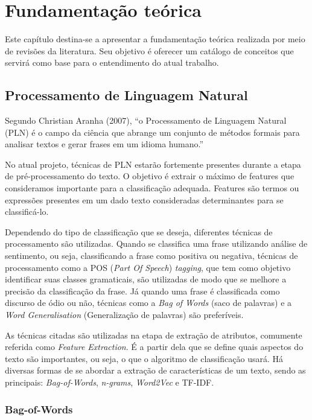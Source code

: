 \chapter[Fundamentação teórica]{Fundamentação teórica}

Este capítulo destina-se a apresentar a fundamentação teórica realizada por meio de revisões da literatura. Seu objetivo é oferecer um catálogo de conceitos que servirá como base para o entendimento do atual trabalho.

\section[Processamento de Linguagem	 Natural]{Processamento de Linguagem Natural}

Segundo Christian Aranha (2007), “o Processamento de Linguagem Natural (PLN) é o campo da ciência que abrange um conjunto de métodos formais para analisar textos e gerar frases em um idioma humano.”

No atual projeto, técnicas de PLN estarão fortemente presentes durante a etapa de pré-processamento do texto. O objetivo é extrair o máximo de features que consideramos importante para a classificação adequada. Features são termos ou expressões presentes em um dado texto consideradas determinantes para se classificá-lo.

Dependendo do tipo de classificação que se deseja, diferentes técnicas de processamento são utilizadas. Quando se classifica uma frase utilizando análise de sentimento, ou seja, classificando a frase como positiva ou negativa, técnicas de processamento como a POS (\textit{Part Of Speech}) \textit{tagging}, que tem como objetivo identificar suas classes gramaticais, são utilizadas de modo que se melhore a precisão da classificação da frase. Já quando uma frase é classificada como discurso de ódio ou não, técnicas como a \textit{Bag of Words} (saco de palavras) e a \textit{Word Generalisation} (Generalização de palavras) são preferíveis.

As técnicas citadas são utilizadas na etapa de extração de atributos, comumente referida como \textit{Feature Extraction}. É a partir dela que se define quais aspectos do texto são importantes, ou seja, o que o algoritmo de classificação usará. Há diversas formas de se abordar a extração de características de um texto, sendo as principais: \textit{Bag-of-Words}, \textit{n-grams}, \textit{Word2Vec} e TF-IDF.

\subsection{Bag-of-Words}

